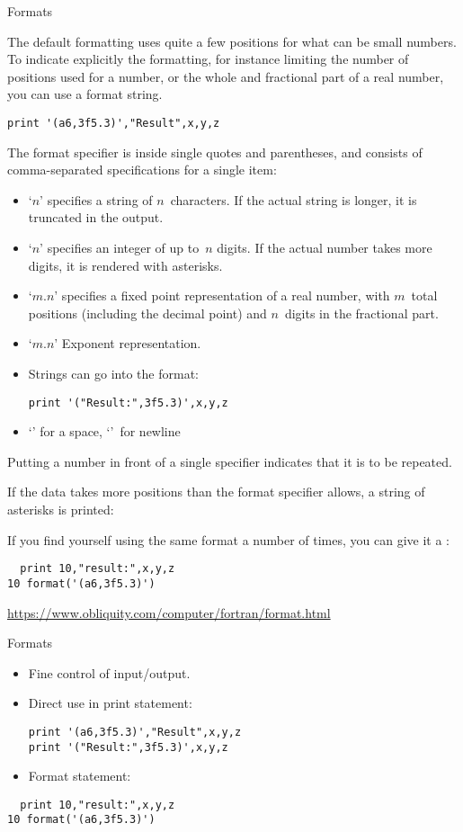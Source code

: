 {Formats}

The default formatting uses quite a few positions for what can be
small numbers. To indicate explicitly the formatting, for instance
limiting the number of positions used for a number, or the whole and
fractional part of a real number, you can use a format string.
\begin{verbatim}
print '(a6,3f5.3)',"Result",x,y,z
\end{verbatim}
The format specifier is inside single quotes and parentheses, and
consists of comma-separated specifications for a single item:
\begin{itemize}
\item `$n$' specifies a string of $n$~characters. If the actual
  string is longer, it is truncated in the output.
\item `$n$' specifies an integer of up to~$n$ digits. If the actual
  number takes more digits, it is rendered with asterisks.
\item `$m.n$' specifies a fixed point representation of a real
  number, with $m$~total positions (including the decimal point)
  and $n$~digits in the fractional part.
\item `$m.n$' Exponent representation.
\item Strings can go into the format:
\begin{verbatim}
print '("Result:",3f5.3)',x,y,z
\end{verbatim}
\item `' for a space, `\n{/}'~for newline
\end{itemize}
Putting a number in front of a single specifier indicates that it is
to be repeated.

If the data takes more positions than the format specifier allows, a
string of asterisks is printed:
%

If you find yourself using the same format a number of times, you can
give it a :
\begin{verbatim}
  print 10,"result:",x,y,z
10 format('(a6,3f5.3)')
\end{verbatim}

\url{https://www.obliquity.com/computer/fortran/format.html}

\begin{slide}{Formats}
  \label{sl:formats}
  \begin{itemize}
  \item
    Fine control of input/output.
  \item
    Direct use in print statement:  
\begin{verbatim}
print '(a6,3f5.3)',"Result",x,y,z
print '("Result:",3f5.3)',x,y,z
\end{verbatim}
\item Format statement:
  \end{itemize}
\begin{verbatim}
  print 10,"result:",x,y,z
10 format('(a6,3f5.3)')
\end{verbatim}
\end{slide}

